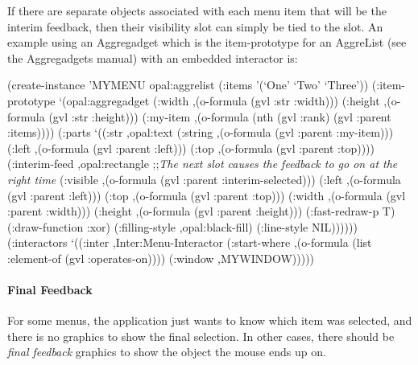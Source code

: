 \vspace{1 line}
\begin{group}
If there are separate objects associated with each menu item that will be
the interim feedback, then their visibility slot can simply be tied to the
 slot.  An example using an Aggregadget which is
the item-prototype for an AggreList (see the Aggregadgets manual) with an
embedded interactor is:
\begin{programexample}
(create-instance 'MYMENU opal:aggrelist
   (:items '(`One' `Two' `Three'))
   (:item-prototype
    `(opal:aggregadget
      (:width ,(o-formula (gvl :str :width)))
      (:height ,(o-formula (gvl :str :height)))
      (:my-item ,(o-formula (nth (gvl :rank) (gvl :parent :items))))
      (:parts
       `((:str ,opal:text
               (:string ,(o-formula (gvl :parent :my-item)))
               (:left ,(o-formula (gvl :parent :left)))
               (:top ,(o-formula (gvl :parent :top))))
         (:interim-feed ,opal:rectangle
          ;;{\it The next slot causes the feedback to go on at the right time}
                        (:visible ,(o-formula (gvl :parent :interim-selected)))
                        (:left ,(o-formula (gvl :parent :left)))
                        (:top ,(o-formula (gvl :parent :top)))
                        (:width ,(o-formula (gvl :parent :width)))
                        (:height ,(o-formula (gvl :parent :height)))
                        (:fast-redraw-p T)
                        (:draw-function :xor)
                        (:filling-style ,opal:black-fill)
                        (:line-style NIL))))))
   (:interactors
    `((:inter ,Inter:Menu-Interactor
              (:start-where ,(o-formula (list :element-of (gvl :operates-on))))
              (:window ,MYWINDOW)))))
\end{programexample}
\end{group}

\paragraph{Final Feedback}
\label{menufinalfeedback}

For some menus, the application just wants to know which item was selected,
and there is no graphics to show the final selection.  In other cases,
there should be {\it final feedback} graphics to show the object the mouse
ends up on.

